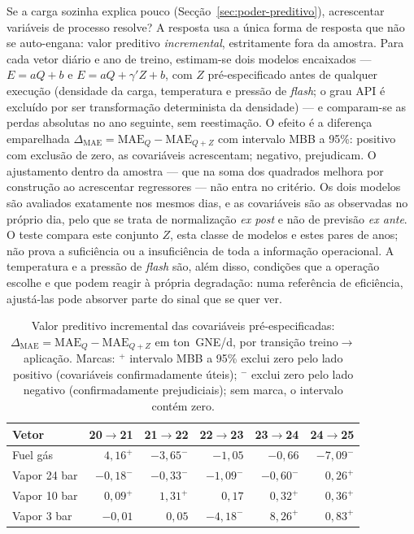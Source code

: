 Se a carga sozinha explica pouco (Secção~\ref{sec:poder-preditivo}), acrescentar
variáveis de processo resolve? A resposta usa a única forma de
resposta que não se auto-engana: valor preditivo \emph{incremental},
estritamente fora da amostra. Para cada vetor diário e ano de treino,
estimam-se dois modelos encaixados --- $E = aQ + b$ e $E = aQ + \gamma'Z + b$,
com $Z$ pré-especificado antes de qualquer execução (densidade da carga,
temperatura e pressão de \emph{flash}; o grau API é excluído por ser
transformação determinista da densidade) --- e comparam-se as perdas absolutas
no ano seguinte, sem reestimação. O efeito é a diferença emparelhada
$\Delta_{\mathrm{MAE}} = \mathrm{MAE}_{Q} - \mathrm{MAE}_{Q+Z}$
 com intervalo MBB a 95\%: positivo com exclusão de zero, as covariáveis acrescentam;
negativo, prejudicam. O ajustamento dentro da amostra --- que na soma dos
quadrados melhora por construção ao acrescentar regressores --- não entra no
critério. Os dois modelos são avaliados exatamente nos mesmos dias, e as
covariáveis são as observadas no próprio dia, pelo que se trata de
normalização \emph{ex post} e não de previsão \emph{ex ante}. O teste
compara este conjunto $Z$, esta classe de modelos e estes pares de anos; não
prova a suficiência ou a insuficiência de toda a informação operacional. A
temperatura e a pressão de \emph{flash} são, além disso, condições que a
operação escolhe e que podem reagir à própria degradação: numa referência de
eficiência, ajustá-las pode absorver parte do sinal que se quer ver.

\begin{table}[htbp]
  \centering
  \caption[Valor incremental das covariáveis]{Valor preditivo
  incremental das covariáveis pré-especificadas:
  $\Delta_{\mathrm{MAE}} = \mathrm{MAE}_{Q} - \mathrm{MAE}_{Q+Z}$ em
  ton~GNE/d, por transição treino${\to}$aplicação. Marcas: $^{+}$ intervalo
  MBB a 95\% exclui zero pelo lado positivo (covariáveis confirmadamente
  úteis); $^{-}$ exclui zero pelo lado negativo (confirmadamente
  prejudiciais); sem marca, o intervalo contém zero.}
  \label{tab:covariaveis-incremental}
  \begin{tabular}{lrrrrr}
    \toprule
    Vetor & \multicolumn{1}{c}{20${\to}$21} & \multicolumn{1}{c}{21${\to}$22}
    & \multicolumn{1}{c}{22${\to}$23} & \multicolumn{1}{c}{23${\to}$24}
    & \multicolumn{1}{c}{24${\to}$25} \\
    \midrule
    Fuel gás     & $4{,}16^{+}$  & $-3{,}65^{-}$ & $-1{,}05$      & $-0{,}66$     & $-7{,}09^{-}$ \\
    Vapor 24 bar & $-0{,}18^{-}$ & $-0{,}33^{-}$ & $-1{,}09^{-}$  & $-0{,}60^{-}$ & $0{,}26^{+}$  \\
    Vapor 10 bar & $0{,}09^{+}$  & $1{,}31^{+}$  & $0{,}17$       & $0{,}32^{+}$  & $0{,}36^{+}$  \\
    Vapor 3 bar  & $-0{,}01$     & $0{,}05$      & $-4{,}18^{-}$  & $8{,}26^{+}$  & $0{,}83^{+}$  \\
    \bottomrule
  \end{tabular}
\end{table}

